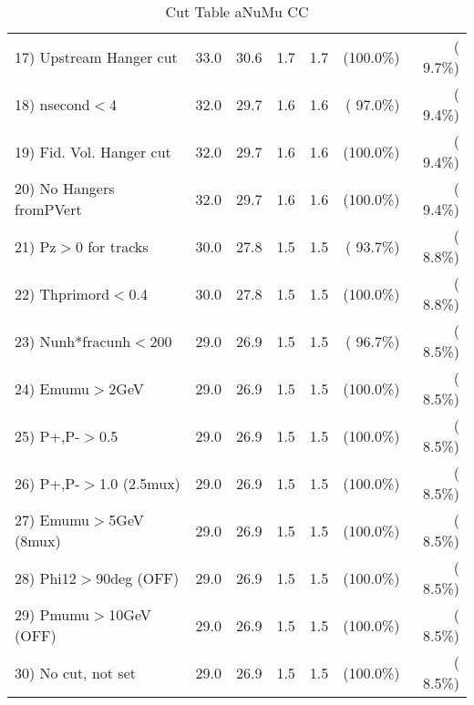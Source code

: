 \begin{table}[h!]
\begin{tabular}{||l||r|r|r|r|r|r||}
 17) Upstream Hanger cut  &         33.0 &         30.6 &          1.7 &          1.7 & (100.0\%) & (  9.7\%) \\
 18) nsecond$<$4          &         32.0 &         29.7 &          1.6 &          1.6 & ( 97.0\%) & (  9.4\%) \\
 19) Fid. Vol. Hanger cut &         32.0 &         29.7 &          1.6 &          1.6 & (100.0\%) & (  9.4\%) \\
 20) No Hangers fromPVert &         32.0 &         29.7 &          1.6 &          1.6 & (100.0\%) & (  9.4\%) \\
 21) Pz$>$0 for tracks    &         30.0 &         27.8 &          1.5 &          1.5 & ( 93.7\%) & (  8.8\%) \\
 22) Thprimord$<$0.4      &         30.0 &         27.8 &          1.5 &          1.5 & (100.0\%) & (  8.8\%) \\
 23) Nunh*fracunh$<$200   &         29.0 &         26.9 &          1.5 &          1.5 & ( 96.7\%) & (  8.5\%) \\
 24) Emumu$>$2GeV         &         29.0 &         26.9 &          1.5 &          1.5 & (100.0\%) & (  8.5\%) \\
 25) P+,P-$>$0.5          &         29.0 &         26.9 &          1.5 &          1.5 & (100.0\%) & (  8.5\%) \\
 26) P+,P-$>$1.0 (2.5mux) &         29.0 &         26.9 &          1.5 &          1.5 & (100.0\%) & (  8.5\%) \\
 27) Emumu$>$5GeV  (8mux) &         29.0 &         26.9 &          1.5 &          1.5 & (100.0\%) & (  8.5\%) \\
 28) Phi12$>$90deg  (OFF) &         29.0 &         26.9 &          1.5 &          1.5 & (100.0\%) & (  8.5\%) \\
 29) Pmumu$>$10GeV  (OFF) &         29.0 &         26.9 &          1.5 &          1.5 & (100.0\%) & (  8.5\%) \\
 30) No cut, not set      &         29.0 &         26.9 &          1.5 &          1.5 & (100.0\%) & (  8.5\%) \\
 \hline
 \hline
 \end{tabular}
 \caption{Cut Table  aNuMu CC }
 \label{tab-cutcohjpsi-mumu_res}
 \end{table}
